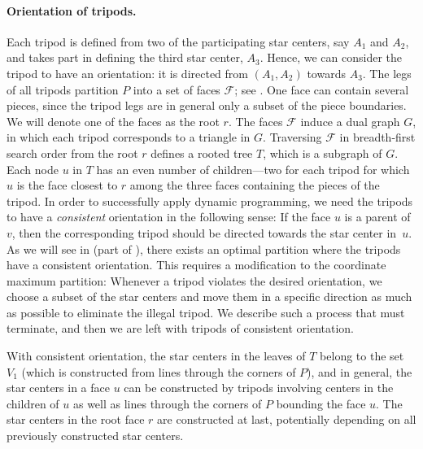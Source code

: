 \documentclass[10pt,a4paper]{article}
\begin{document}
\paragraph{Orientation of tripods.}
Each tripod is defined from two of the participating star centers, say $A_1$ and $A_2$, and takes part in defining the third star center, $A_3$.
Hence, we can consider the tripod to have an orientation: it is directed from $(A_1, A_2)$ towards $A_3$.
The legs of all tripods partition $P$ into a set of faces $\mathcal F$; see .
One face can contain several pieces, since the tripod legs are in general only a subset of the piece boundaries.
We will denote one of the faces as the root $r$.
The faces $\mathcal F$ induce a dual graph $G$, in which each tripod corresponds to a triangle in $G$.
Traversing $\mathcal F$ in breadth-first search order from the root $r$ defines a rooted tree $T$, which is a subgraph of $G$.
Each node $u$ in $T$ has an even number of children---two for each tripod for which $u$ is the face closest to $r$ among the three faces containing the pieces of the tripod.
In order to successfully apply dynamic programming, we need the tripods to have a \emph{consistent} orientation in the following sense:
If the face $u$ is a parent of $v$, then the corresponding tripod should be directed towards the star center in~$u$.
As we will see in  (part of ), there exists an optimal partition where the tripods have a consistent orientation.
This requires a modification to the coordinate maximum partition: Whenever a tripod violates the desired orientation, we choose a subset of the star centers and move them in a specific direction as much as possible to eliminate the illegal tripod.
We describe such a process that must terminate, and then we are left with tripods of consistent orientation.

With consistent orientation, the star centers in the leaves of $T$ belong to the set $V_1$ (which is constructed from lines through the corners of $P$), and in general, the star centers in a face $u$ can be constructed by tripods involving centers in the children of $u$ as well as lines through the corners of $P$ bounding the face $u$.
The star centers in the root face $r$ are constructed at last, potentially depending on all previously constructed star centers.
\end{document}
